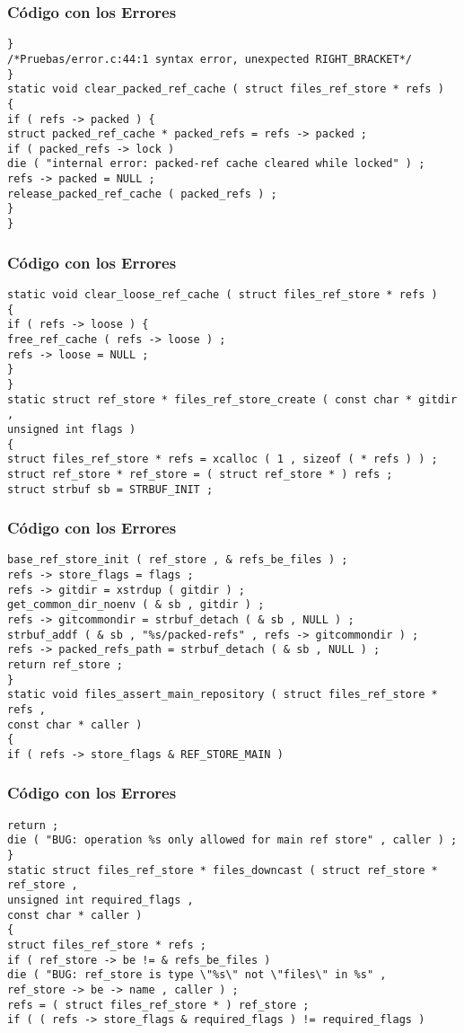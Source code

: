 \documentclass{beamer}
\begin{document}
\begin{frame}[fragile]
\frametitle{C\'odigo con los Errores}
\begin{verbatim}
} 
/*Pruebas/error.c:44:1 syntax error, unexpected RIGHT_BRACKET*/
} 
static void clear_packed_ref_cache ( struct files_ref_store * refs ) 
{ 
if ( refs -> packed ) { 
struct packed_ref_cache * packed_refs = refs -> packed ; 
if ( packed_refs -> lock ) 
die ( "internal error: packed-ref cache cleared while locked" ) ; 
refs -> packed = NULL ; 
release_packed_ref_cache ( packed_refs ) ; 
} 
} 
\end{verbatim}
\end{frame}
\begin{frame}[fragile]
\frametitle{C\'odigo con los Errores}
\begin{verbatim}
static void clear_loose_ref_cache ( struct files_ref_store * refs ) 
{ 
if ( refs -> loose ) { 
free_ref_cache ( refs -> loose ) ; 
refs -> loose = NULL ; 
} 
} 
static struct ref_store * files_ref_store_create ( const char * gitdir , 
unsigned int flags ) 
{ 
struct files_ref_store * refs = xcalloc ( 1 , sizeof ( * refs ) ) ; 
struct ref_store * ref_store = ( struct ref_store * ) refs ; 
struct strbuf sb = STRBUF_INIT ; 
\end{verbatim}
\end{frame}
\begin{frame}[fragile]
\frametitle{C\'odigo con los Errores}
\begin{verbatim}
base_ref_store_init ( ref_store , & refs_be_files ) ; 
refs -> store_flags = flags ; 
refs -> gitdir = xstrdup ( gitdir ) ; 
get_common_dir_noenv ( & sb , gitdir ) ; 
refs -> gitcommondir = strbuf_detach ( & sb , NULL ) ; 
strbuf_addf ( & sb , "%s/packed-refs" , refs -> gitcommondir ) ; 
refs -> packed_refs_path = strbuf_detach ( & sb , NULL ) ; 
return ref_store ; 
} 
static void files_assert_main_repository ( struct files_ref_store * refs , 
const char * caller ) 
{ 
if ( refs -> store_flags & REF_STORE_MAIN ) 
\end{verbatim}
\end{frame}
\begin{frame}[fragile]
\frametitle{C\'odigo con los Errores}
\begin{verbatim}
return ; 
die ( "BUG: operation %s only allowed for main ref store" , caller ) ; 
} 
static struct files_ref_store * files_downcast ( struct ref_store * ref_store , 
unsigned int required_flags , 
const char * caller ) 
{ 
struct files_ref_store * refs ; 
if ( ref_store -> be != & refs_be_files ) 
die ( "BUG: ref_store is type \"%s\" not \"files\" in %s" , 
ref_store -> be -> name , caller ) ; 
refs = ( struct files_ref_store * ) ref_store ; 
if ( ( refs -> store_flags & required_flags ) != required_flags ) 
\end{verbatim}
\end{frame}
\end{document}
